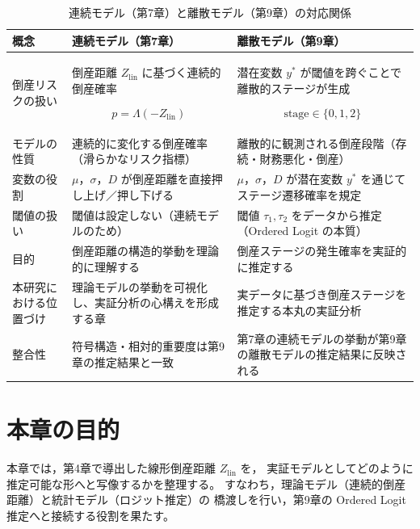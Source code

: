 \begin{table}[H]
\centering
\caption{連続モデル（第7章）と離散モデル（第9章）の対応関係}
\label{tab:continuous_discrete_mapping}
\begin{tabular}{p{4cm} p{5cm} p{6cm}}
\toprule
\textbf{概念} & \textbf{連続モデル（第7章）} & \textbf{離散モデル（第9章）} \\
\midrule

倒産リスクの扱い &
倒産距離 $Z_{\text{lin}}$ に基づく連続的倒産確率


\[
p = \Lambda(-Z_{\text{lin}})
\]


&
潜在変数 $y^*$ が閾値を跨ぐことで離散的ステージが生成


\[
\text{stage} \in \{0,1,2\}
\]

 \\

モデルの性質 &
連続的に変化する倒産確率（滑らかなリスク指標） &
離散的に観測される倒産段階（存続・財務悪化・倒産） \\

変数の役割 &
$\mu$，$\sigma$，$D$ が倒産距離を直接押し上げ／押し下げる &
$\mu$，$\sigma$，$D$ が潜在変数 $y^*$ を通じてステージ遷移確率を規定 \\

閾値の扱い &
閾値は設定しない（連続モデルのため） &
閾値 $\tau_1, \tau_2$ をデータから推定（Ordered Logit の本質） \\

目的 &
倒産距離の構造的挙動を理論的に理解する &
倒産ステージの発生確率を実証的に推定する \\

本研究における位置づけ &
理論モデルの挙動を可視化し、実証分析の心構えを形成する章 &
実データに基づき倒産ステージを推定する本丸の実証分析 \\

整合性 &
符号構造・相対的重要度は第9章の推定結果と一致 &
第7章の連続モデルの挙動が第9章の離散モデルの推定結果に反映される \\

\bottomrule
\end{tabular}
\end{table}


\section{本章の目的}

本章では，第4章で導出した線形倒産距離 $Z_{\text{lin}}$ を，
実証モデルとしてどのように推定可能な形へと写像するかを整理する。
すなわち，理論モデル（連続的倒産距離）と統計モデル（ロジット推定）の
橋渡しを行い，第9章の Ordered Logit 推定へと接続する役割を果たす。

